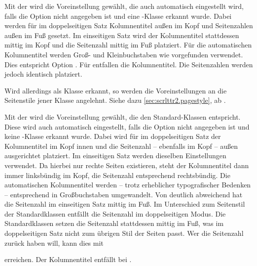 Mit der 
 wird
die Voreinstellung gewählt, die auch automatisch eingestellt wird, falls die
Option nicht angegeben ist und eine \KOMAScript-Klasse erkannt wurde. Dabei
werden für  im doppelseitigen Satz
Kolumnentitel außen im Kopf und Seitenzahlen außen im Fuß gesetzt. Im
einseitigen Satz wird der Kolumnentitel stattdessen mittig im Kopf und die
Seitenzahl mittig im Fuß platziert. Für die automatischen Kolumnentitel werden
Groß- und Kleinbuchstaben wie vorgefunden verwendet. Dies entspricht Option
%
. Für
 entfallen die
Kolumnentitel. Die Seitenzahlen werden jedoch identisch platziert.

Wird allerdings \hyperref[cha:scrlttr2]{}%
%
 als Klasse erkannt, so werden die Voreinstellungen an
die Seitenstile jener Klasse angelehnt. Siehe dazu
\autoref{sec:scrlttr2.pagestyle}, ab .

Mit der 
 wird die
Voreinstellung gewählt, die den Standard-Klassen entspricht. Diese wird auch
automatisch eingestellt, falls die Option nicht angegeben ist und keine
\KOMAScript-Klasse erkannt wurde. Dabei wird für
 im doppelseitigen Satz der
Kolumnentitel im Kopf innen und die Seitenzahl -- ebenfalls im Kopf -- außen
ausgerichtet platziert. Im einseitigen Satz werden dieselben Einstellungen
verwendet. Da hierbei nur rechte Seiten existieren, steht der Kolumnentitel
dann immer linksbündig im Kopf, die Seitenzahl entsprechend rechtsbündig. Die
automatischen Kolumnentitel werden -- trotz erheblicher typografischer
Bedenken -- entsprechend
%
 in Großbuchstaben
umgewandelt. Von  deutlich
abweichend hat  die Seitenzahl
im einseitigen Satz mittig im Fuß. Im Unterschied zum Seitenstil  der Standardklassen
entfällt die Seitenzahl im doppelseitigen Modus. Die Standardklassen setzen
die Seitenzahl stattdessen mittig im Fuß, was im doppelseitigen Satz nicht zum
übrigen Stil der Seiten passt. %
\iftrue %
Wer die Seitenzahl zurück haben will, kann dies mit
\begin{lstcode}
  \cfoot[\pagemark]{}
\end{lstcode}
erreichen. %
\fi%
Der Kolumnentitel entfällt bei
.

